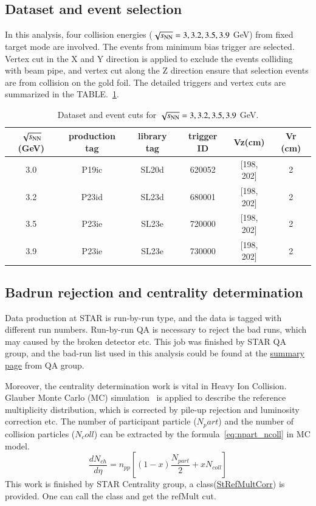 \subsection{Dataset and event selection}

In this analysis, four collision energies ($\sqrt{s_\text{NN}}=3, 3.2, 3.5, 3.9$ GeV) from fixed target mode are involved.
The events from minimum bias trigger are selected. Vertex cut in the X and Y direction is applied to exclude the events colliding with beam pipe, 
and vertex cut along the Z direction ensure that selection events are from collision on the gold foil.
The detailed triggers and vertex cuts are summarized in the TABLE.~\ref{tab:dataset}.
\begin{table}
\caption{Dataset and event cuts for $\sqrt{s_\text{NN}}=3, 3.2, 3.5, 3.9$ GeV.}
\label{tab:dataset}
\begin{tabular}{|c|c|c|c|c|c|}
\hline
$\sqrt{s_\text{NN}}$(GeV) & production tag & library tag & trigger ID & Vz(cm)     & Vr (cm) \\ \hline
3.0         & P19ic          & SL20d       & 620052     & [198, 202] & 2       \\ \hline
3.2         & P23id          & SL23d       & 680001     & [198, 202] & 2       \\ \hline
3.5         & P23ie          & SL23e       & 720000     & [198, 202] & 2       \\ \hline
3.9         & P23ie          & SL23e       & 730000     & [198, 202] & 2       \\ \hline
\end{tabular}
\end{table}


\subsection{Badrun rejection and centrality determination}

Data production at STAR is run-by-run type, and the data is tagged with different run numbers.
Run-by-run QA is necessary to reject the bad runs, which may caused by the broken detector etc.
This job was finished by STAR QA group, and the bad-run list used in this analysis could be found at the
\href{https://drupal.star.bnl.gov/STAR/pwg/common/bes-ii-run-qa/FXT-datasets}{summary page} from QA group.

Moreover, the centrality determination work is vital in Heavy Ion Collision.
Glauber Monte Carlo (MC) simulation~\cite{KHARZEEV2001121} is applied to describe the reference multiplicity distribution, 
which is corrected by pile-up rejection and luminosity correction etc.
The number of participant particle ($N_part$) and the number of collision particles ($N_coll$)
 can be extracted by the formula~\ref{eq:npart_ncoll} in MC model.
 \begin{equation}
    \frac{d N_{c h}}{d \eta}=n_{p p}\left[(1-x) \frac{N_{p a r t}}{2}+x N_{c o l l}\right]
\label{eq:npart_ncoll}
\end{equation}
This work is finished by STAR Centrality group, a class(\href{https://github.com/star-bnl/star-sw/tree/main/StRoot/StRefMultCorr}{StRefMultCorr}) is provided.
One can call the class and get the refMult cut.


